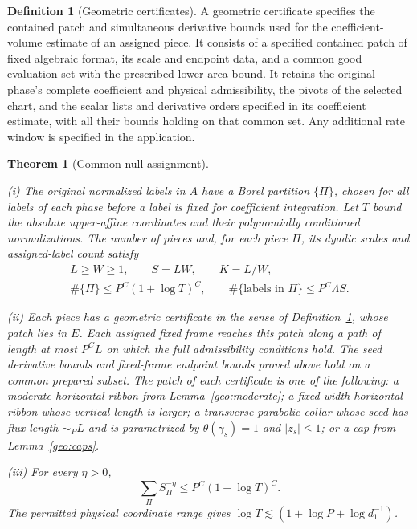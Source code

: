 \documentclass[11pt]{amsart}
\newtheorem{theorem}{Theorem}[section]
\theoremstyle{definition}
\newtheorem{definition}{Definition}[section]
\theoremstyle{remark}
\numberwithin{equation}{section}
\begin{document}
\begin{definition}[Geometric certificates]\label{def:geometric-certificate}
A geometric certificate specifies the contained patch and simultaneous derivative bounds used for the coefficient-volume estimate of an assigned piece. It consists of a specified contained patch of fixed algebraic format, its scale and endpoint data, and a common good evaluation set with the prescribed lower area bound. It retains the original phase's complete coefficient and physical admissibility, the pivots of the selected chart, and the scalar lists and derivative orders specified in its coefficient estimate, with all their bounds holding on that common set. Any additional rate window is specified in the application.
\end{definition}
\begin{theorem}[Common null assignment]\label{geo:common-allocation}

\leavevmode\noindent\textup{(i)} The original normalized labels in $A$ have a Borel partition $\{\Pi\}$, chosen for all labels of each phase before a label is fixed for coefficient integration. Let $T$ bound the absolute upper-affine coordinates and their polynomially conditioned normalizations. The number of pieces and, for each piece $\Pi$, its dyadic scales and assigned-label count satisfy
\[
\begin{gathered}
L\ge W\ge1,\qquad S=LW,\qquad K=L/W,\\
\#\{\Pi\}\le P^C(1+\log T)^C,\qquad \#\{\text{labels in }\Pi\}\le P^C\Lambda S.
\end{gathered}
\]

\noindent\textup{(ii)} Each piece has a geometric certificate in the sense of Definition~\ref{def:geometric-certificate}, whose patch lies in $E$. Each assigned fixed frame reaches this patch along a path of length at most $P^CL$ on which the full admissibility conditions hold. The seed derivative bounds and fixed-frame endpoint bounds proved above hold on a common prepared subset. The patch of each certificate is one of the following: a moderate horizontal ribbon from Lemma~\ref{geo:moderate}; a fixed-width horizontal ribbon whose vertical length is larger; a transverse parabolic collar whose seed has flux length $\sim_P L$ and is parametrized by $\theta(\gamma_s)=1$ and $|z_s|\le1$; or a cap from Lemma~\ref{geo:caps}.

\noindent\textup{(iii)} For every $\eta>0$,
\begin{equation}\label{geo:inverse-area-weight}
\sum_{\Pi}S_\Pi^{-\eta}\le P^C(1+\log T)^C.
\end{equation}
The permitted physical coordinate range gives $\log T\lesssim (1+\log P+\log d_1^{-1})$.
\end{theorem}
\end{document}
